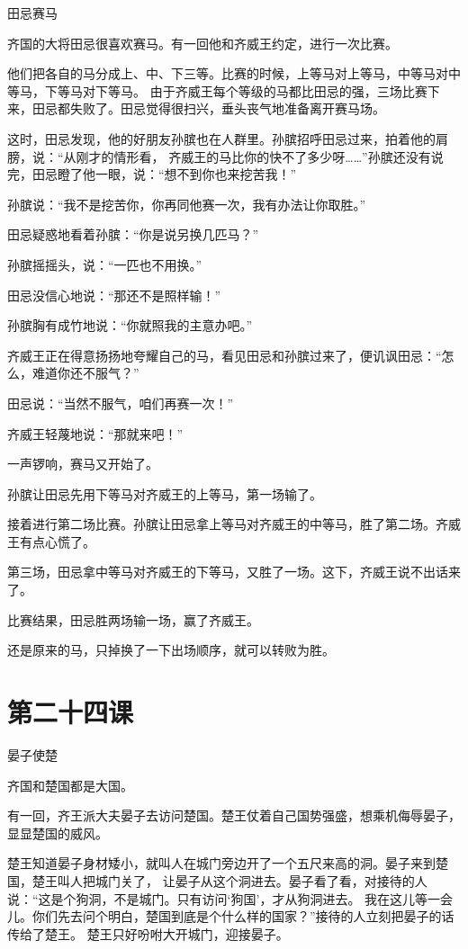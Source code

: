 \documentclass[12pt,UTF8]{ctexbook}
\begin{document}
田忌赛马

齐国的大将田忌很喜欢赛马。有一回他和齐威王约定，进行一次比赛。

他们把各自的马分成上、中、下三等。比赛的时候，上等马对上等马，中等马对中等马，下等马对下等马。
由于齐威王每个等级的马都比田忌的强，三场比赛下来，田忌都失败了。田忌觉得很扫兴，垂头丧气地准备离开赛马场。

这时，田忌发现，他的好朋友孙膑也在人群里。孙膑招呼田忌过来，拍着他的肩膀，说：“从刚才的情形看，
齐威王的马比你的快不了多少呀……”孙膑还没有说完，田忌瞪了他一眼，说：“想不到你也来挖苦我！”

孙膑说：“我不是挖苦你，你再同他赛一次，我有办法让你取胜。”

田忌疑惑地看着孙膑：“你是说另换几匹马？”

孙膑摇摇头，说：“一匹也不用换。”

田忌没信心地说：“那还不是照样输！”

孙膑胸有成竹地说：“你就照我的主意办吧。”

齐威王正在得意扬扬地夸耀自己的马，看见田忌和孙膑过来了，便讥讽田忌：“怎么，难道你还不服气？”

田忌说：“当然不服气，咱们再赛一次！”

齐威王轻蔑地说：“那就来吧！”

一声锣响，赛马又开始了。

孙膑让田忌先用下等马对齐威王的上等马，第一场输了。

接着进行第二场比赛。孙膑让田忌拿上等马对齐威王的中等马，胜了第二场。齐威王有点心慌了。

第三场，田忌拿中等马对齐威王的下等马，又胜了一场。这下，齐威王说不出话来了。

比赛结果，田忌胜两场输一场，赢了齐威王。

还是原来的马，只掉换了一下出场顺序，就可以转败为胜。

\section{第二十四课}

晏子使楚

齐国和楚国都是大国。

有一回，齐王派大夫晏子去访问楚国。楚王仗着自己国势强盛，想乘机侮辱晏子，显显楚国的威风。

楚王知道晏子身材矮小，就叫人在城门旁边开了一个五尺来高的洞。晏子来到楚国，楚王叫人把城门关了，
让晏子从这个洞进去。晏子看了看，对接待的人说：“这是个狗洞，不是城门。只有访问‘狗国’，才从狗洞进去。
我在这儿等一会儿。你们先去问个明白，楚国到底是个什么样的国家？”接待的人立刻把晏子的话传给了楚王。
楚王只好吩咐大开城门，迎接晏子。
\end{document}
